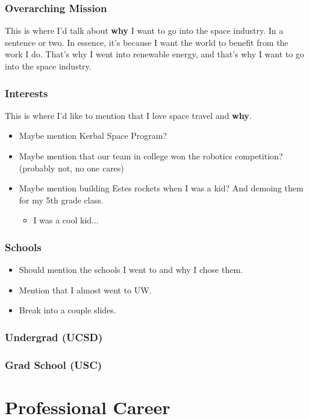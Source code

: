 \documentclass[aspectratio=169]{beamer}
\begin{document}
\begin{frame}
  \frametitle{Overarching Mission}
  This is where I'd talk about \textbf{why} I want to go into the space industry.  In a sentence or two.  In essence, it's because I want the world to benefit from the work I do.  That's why I went into renewable energy, and that's why I want to go into the space industry.  
\end{frame}

\begin{frame}
  \frametitle{Interests} This is where I'd like to mention that I love
  space travel and \textbf{why}.
  \begin{itemize}
  \item Maybe mention Kerbal Space Program?
  \item Maybe mention that our team in college won the robotics
    competition?  (probably not, no one cares)
  \item Maybe mention building Estes rockets when I was a kid?  And
    demoing them for my 5th grade class.
    \begin{itemize}
    \item I was a cool kid...
    \end{itemize}
  \end{itemize}
\end{frame}

\begin{frame}
  \frametitle{Schools}
  \begin{itemize}
  \item Should mention the schools I went to and why I chose them.
  \item Mention that I almost went to UW.
  \item Break into a couple slides.
  \end{itemize}
\end{frame}

\begin{frame}
  \frametitle{Undergrad (UCSD)}
\end{frame}

%  
\begin{frame}
  \frametitle{Grad School (USC)}
\end{frame}

\section{Professional Career}
\end{document}
